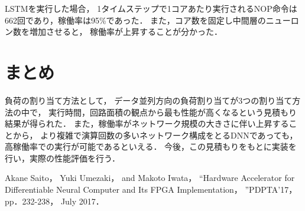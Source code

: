\documentclass[a4j]{jarticle}
\begin{document}
\begin{Abstract}
LSTMを実行した場合，
1タイムステップで1コアあたり実行されるNOP命令は662回であり，稼働率は95\%であった．
また，コア数を固定し中間層のニューロン数を増加させると，
稼働率が上昇することが分かった．
 \section{まとめ}
負荷の割り当て方法として，
データ並列方向の負荷割り当てが3つの割り当て方法の中で，
実行時間，回路面積の観点から最も性能が高くなるという見積もり結果が得られた．
また，稼働率がネットワーク規模の大きさに伴い上昇することから，
より複雑で演算回数の多いネットワーク構成をとるDNNであっても，
高稼働率での実行が可能であるといえる．
今後，この見積もりをもとに実装を行い，実際の性能評価を行う．


\begin{thebibliography}{99}
  Akane Saito， Yuki Umezaki， and Makoto Iwata，
  ``Hardware Accelerator for Differentiable Neural Computer and Its FPGA Implementation，
  ''PDPTA'17， pp．232-238， July 2017．
\end{thebibliography}

\end{Abstract}
\end{document}
